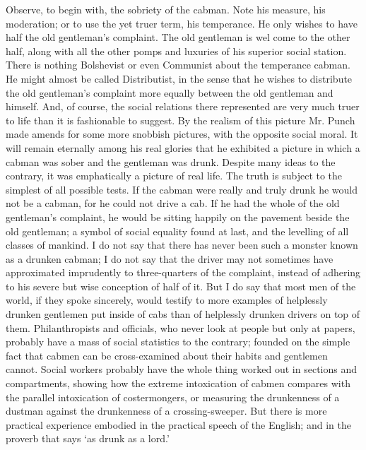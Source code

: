 \documentclass{book}
\begin{document}
Observe, to begin with, the sobriety of the cabman. Note his measure, his moderation; or to use the yet truer term, his temperance. He only wishes to have half the old gentleman’s complaint. The old gentleman is wel come to the other half, along with all the other pomps and luxuries of his superior social station. There is nothing Bolshevist or even Communist about the temperance cabman. He might almost be called Distributist, in the sense that he wishes to distribute the old gentleman’s complaint more equally between the old gentleman and himself. And, of course, the social relations there represented are very much truer to life than it is fashionable to suggest. By the realism of this picture Mr. Punch made amends for some more snobbish pictures, with the opposite social moral. It will remain eternally among his real glories that he exhibited a picture in which a cabman was sober and the gentleman was drunk. Despite many ideas to the contrary, it was emphatically a picture of real life. The truth is subject to the simplest of all possible tests. If the cabman were really and truly drunk he would not be a cabman, for he could not drive a cab. If he had the whole of the old gentleman’s complaint, he would be sitting happily on the pavement beside the old gentleman; a symbol of social equality found at last, and the levelling of all classes of mankind. I do not say that there has never been such a monster known as a drunken cabman; I do not say that the driver may not sometimes have approximated imprudently to three-quarters of the complaint, instead of adhering to his severe but wise conception of half of it. But I do say that most men of the world, if they spoke sincerely, would testify to more examples of helplessly drunken gentlemen put inside of cabs than of helplessly drunken drivers on top of them. Philanthropists and officials, who never look at people but only at papers, probably have a mass of social statistics to the contrary; founded on the simple fact that cabmen can be cross-examined about their habits and gentlemen cannot. Social workers probably have the whole thing worked out in sections and compartments, showing how the extreme intoxication of cabmen compares with the parallel intoxication of costermongers, or measuring the drunkenness of a dustman against the drunkenness of a crossing-sweeper. But there is more practical experience embodied in the practical speech of the English; and in the proverb that says ‘as drunk as a lord.’
\end{document}
